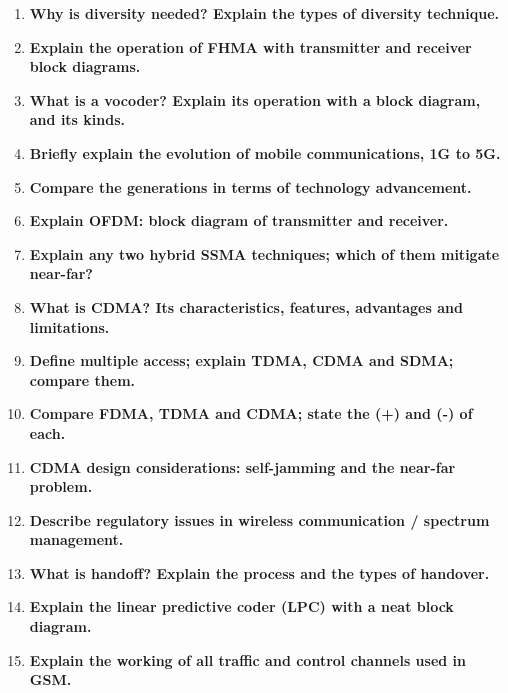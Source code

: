 \begin{enumerate}
  \item \textbf{Why is diversity needed? Explain the types of diversity technique.}
        \hfill {} 
  \item \textbf{Explain the operation of FHMA with transmitter and receiver block diagrams.}
        \hfill {} 
  \item \textbf{What is a vocoder? Explain its operation with a block diagram, and its kinds.}
        \hfill {} 
  \item \textbf{Briefly explain the evolution of mobile communications, 1G to 5G.}
        \hfill {} 
  \item \textbf{Compare the generations in terms of technology advancement.}
        \hfill {} 
  \item \textbf{Explain OFDM: block diagram of transmitter and receiver.}
        \hfill {} 
  \item \textbf{Explain any two hybrid SSMA techniques; which of them mitigate near-far?}
        \hfill {} 
  \item \textbf{What is CDMA? Its characteristics, features, advantages and limitations.}
        \hfill {} 
  \item \textbf{Define multiple access; explain TDMA, CDMA and SDMA; compare them.}
        \hfill {} 
  \item \textbf{Compare FDMA, TDMA and CDMA; state the (+) and (-) of each.}
        \hfill {} 
  \item \textbf{CDMA design considerations: self-jamming and the near-far problem.}
        \hfill {} 
  \item \textbf{Describe regulatory issues in wireless communication / spectrum management.}
        \hfill {} 
  \item \textbf{What is handoff? Explain the process and the types of handover.}
        \hfill {} 
  \item \textbf{Explain the linear predictive coder (LPC) with a neat block diagram.}
        \hfill {} 
  \item \textbf{Explain the working of all traffic and control channels used in GSM.}
        \hfill {} 
\end{enumerate}

